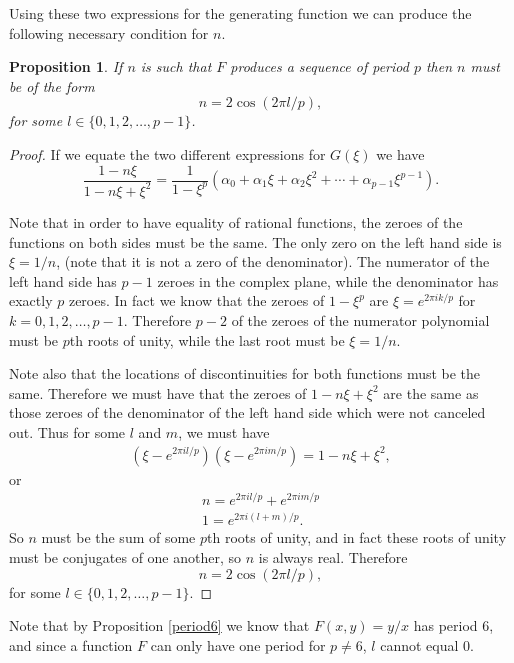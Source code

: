 \documentclass[12pt]{article}
\newtheorem{proposition}{Proposition}
\begin{document}
Using these two expressions for the generating function we can produce the following necessary condition for $n$. 
\begin{proposition} 
\label{must}
If $n$ is such that $F$ produces a sequence of period $p$ then $n$ must be of the form
\begin{equation*}
n= 2 \cos(2 \pi l/p), 
\end{equation*}
for some $l \in \{0,1,2, \ldots, p-1\}$. 
\end{proposition}
\begin{proof}
If we equate the two different expressions for $G(\xi)$ we have 
\begin{equation*}
\frac{ 1 - n\xi}{1 - n \xi + \xi^2} = \frac{1}{1- \xi^p} (\alpha_0 + \alpha_1 \xi + \alpha_2 \xi^2 + \cdots + \alpha_{p-1} \xi^{p-1}).
\end{equation*}

Note that in order to have equality of rational functions, the zeroes of the functions on both sides must be the same. 
The only zero on the left hand side is $\xi = 1/n$, (note that it is not a zero of the denominator). The numerator of the left hand side has $p-1$ zeroes in the complex plane, while the denominator has exactly $p$ zeroes. In fact we know that the zeroes of $1 - \xi^p$ are $\xi = e^{2 \pi i k/p}$ for $k=0,1,2, \ldots, p-1$. Therefore $p-2$ of the zeroes of the numerator polynomial must be $p$th roots of unity, while the last root must be $\xi = 1/n$. 

Note also that the locations of discontinuities for both functions must be the same. Therefore we must have that the zeroes of $1-n\xi + \xi^2$ are the same as those zeroes of the denominator of the left hand side which were not canceled out. Thus for some $l$ and $m$, we must have 
\begin{align*}
(\xi - e^{2 \pi i l/p})(\xi - e^{2 \pi i m/p}) = 1 - n \xi + \xi^2,
\end{align*}
or 
\begin{align*}
n = e^{2 \pi i l/p} + e^{2 \pi i m/p} \\
1 = e^{2 \pi i (l+m)/p}.
\end{align*}
So $n$ must be the sum of some $p$th roots of unity, and in fact these roots of unity must be conjugates of one another, so $n$ is always real. Therefore  
\begin{equation*}
n= 2 \cos(2 \pi l/p), 
\end{equation*}
for some $l \in \{0, 1,2, \ldots, p-1\}$. 
\end{proof}
Note that by Proposition \ref{period6} we know that $F(x,y)=y/x$ has period 6, and since a function $F$ can only have one period for $p \neq 6$, $l$ cannot equal 0. 
\end{document}
